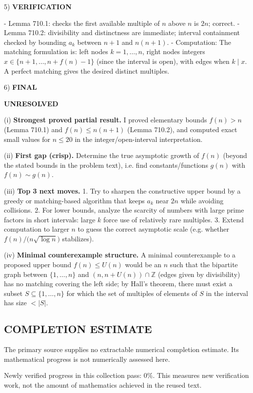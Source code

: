 5) \textbf{VERIFICATION}

- Lemma 710.1: checks the first available multiple of $n$ above $n$ is $2n$; correct.
- Lemma 710.2: divisibility and distinctness are immediate; interval containment checked by bounding $a_k$ between $n+1$ and $n(n+1)$.
- Computation: The matching formulation is: left nodes $k=1,\dots,n$, right nodes integers $x\in\{n+1,\dots,n+f(n)-1\}$ (since the interval is open), with edges when $k\mid x$. A perfect matching gives the desired distinct multiples.

6) \textbf{FINAL}

\textbf{UNRESOLVED}

(i) \textbf{Strongest proved partial result.}
I proved elementary bounds $f(n)>n$ (Lemma 710.1) and $f(n)\le n(n+1)$ (Lemma 710.2), and computed exact small values for $n\le 20$ in the integer/open-interval interpretation.

(ii) \textbf{First gap (crisp).}
Determine the true asymptotic growth of $f(n)$ (beyond the stated bounds in the problem text), i.e. find constants/functions $g(n)$ with $f(n)\sim g(n)$.

(iii) \textbf{Top 3 next moves.}
1. Try to sharpen the constructive upper bound by a greedy or matching-based algorithm that keeps $a_k$ near $2n$ while avoiding collisions.
2. For lower bounds, analyze the scarcity of numbers with large prime factors in short intervals: large $k$ force use of relatively rare multiples.
3. Extend computation to larger $n$ to guess the correct asymptotic scale (e.g. whether $f(n)/\bigl(n\sqrt{\log n}\bigr)$ stabilizes).

(iv) \textbf{Minimal counterexample structure.}
A minimal counterexample to a proposed upper bound $f(n)\le U(n)$ would be an $n$ such that the bipartite graph between $\{1,\dots,n\}$ and $(n,n+U(n))\cap\mathbb{Z}$ (edges given by divisibility) has no matching covering the left side; by Hall's theorem, there must exist a subset $S\subseteq\{1,\dots,n\}$ for which the set of multiples of elements of $S$ in the interval has size $<|S|$.


\subsection*{COMPLETION ESTIMATE}
The primary source supplies no extractable numerical completion estimate. Its mathematical progress is not numerically assessed here.

Newly verified progress in this collection pass: $0\%$. This measures new verification work, not the amount of mathematics achieved in the reused text.
